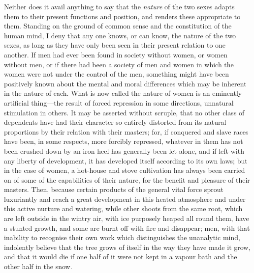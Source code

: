 \documentclass[12pt]{report}
\begin{document}
Neither does it avail anything to say that the \emph{nature} of the two sexes adapts them to their present functions and position, and renders these appropriate to them. Standing on the ground of common sense and the constitution of the human mind, I deny that any one knows, or can know, the nature of the two sexes, as long as they have only been seen in their present relation to one another. If men had ever been found in society without women, or women without men, or if there had been a society of men and women in which the women were not under the control of the men, something might have been positively known about the mental and moral differences which may be inherent in the nature of each. What is now called the nature of women is an eminently artificial thing—the result of forced repression in some directions, unnatural stimulation in others. It may be asserted without scruple, that no other class of dependents have had their character so entirely distorted from its natural proportions by their relation with their masters; for, if conquered and slave races have been, in some respects, more forcibly repressed, whatever in them has not been crushed down by an iron heel has generally been let alone, and if left with any liberty of development, it has developed itself according to its own laws; but in the case of women, a hot-house and stove cultivation has always been carried on of some of the capabilities of their nature, for the benefit and pleasure of their masters. Then, because certain products of the general vital force sprout luxuriantly and reach a great development in this heated atmosphere and under this active nurture and watering, while other shoots from the same root, which are left outside in the wintry air, with ice purposely heaped all round them, have a stunted growth, and some are burnt off with fire and disappear; men, with that inability to recognise their own work which distinguishes the unanalytic mind, indolently believe that the tree grows of itself in the way they have made it grow, and that it would die if one half of it were not kept in a vapour bath and the other half in the snow.
\end{document}
